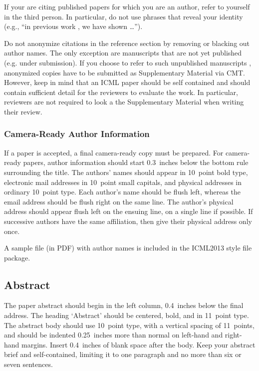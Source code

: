 \documentclass{article}
\begin{document}
If your are citing published papers for which you are an author, refer
to yourself in the third person. In particular, do not use phrases
that reveal your identity (e.g., ``in previous work \cite{langley00}, we 
have shown \ldots'').

Do not anonymize citations in the reference section by removing or
blacking out author names. The only exception are manuscripts that are
not yet published (e.g. under submission). If you choose to refer to
such unpublished manuscripts \cite{anonymous}, anonymized copies have 
to be submitted
as Supplementary Material via CMT. However, keep in mind that an ICML
paper should be self contained and should contain sufficient detail
for the reviewers to evaluate the work. In particular, reviewers are
not required to look a the Supplementary Material when writing their
review.

\subsubsection{Camera-Ready Author Information}
\label{final author}

If a paper is accepted, a final camera-ready copy must be prepared.
%
For camera-ready papers, author information should start 0.3~inches
below the bottom rule surrounding the title. The authors' names should
appear in 10~point bold type, electronic mail addresses in 10~point
small capitals, and physical addresses in ordinary 10~point type.
Each author's name should be flush left, whereas the email address
should be flush right on the same line. The author's physical address
should appear flush left on the ensuing line, on a single line if
possible. If successive authors have the same affiliation, then give
their physical address only once.

A sample file (in PDF) with author names is included in the ICML2013 
style file package.

\subsection{Abstract}

The paper abstract should begin in the left column, 0.4~inches below
the final address. The heading `Abstract' should be centered, bold,
and in 11~point type. The abstract body should use 10~point type, with
a vertical spacing of 11~points, and should be indented 0.25~inches
more than normal on left-hand and right-hand margins. Insert
0.4~inches of blank space after the body. Keep your abstract brief and 
self-contained,
limiting it to one paragraph and no more than six or seven sentences.
\end{document}
